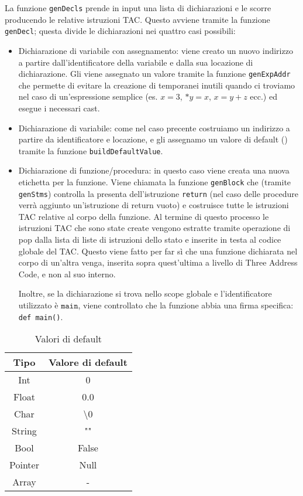 La funzione {\tt genDecls} prende in input una lista di dichiarazioni e le scorre producendo le relative istruzioni TAC. Questo avviene tramite la funzione {\tt genDecl}; questa divide le dichiarazioni nei quattro casi possibili:
\begin{itemize}
    \item Dichiarazione di variabile con assegnamento: viene creato un nuovo indirizzo a partire dall'identificatore della variabile e dalla sua locazione di dichiarazione. Gli viene assegnato un valore tramite la funzione {\tt genExpAddr} che permette di evitare la creazione di temporanei inutili quando ci troviamo nel caso di un'espressione semplice (es. $x = 3$, $*y= x$, $x = y + z$ ecc.) ed esegue i necessari cast.
    \item Dichiarazione di variabile: come nel caso precente costruiamo un indirizzo a partire da identificatore e locazione, e gli assegnamo un valore di default (\label{table:valori_default}) tramite la funzione {\tt buildDefaultValue}.
    \item Dichiarazione di funzione/procedura: in questo caso viene creata una nuova etichetta per la funzione. Viene chiamata la funzione {\tt genBlock} che (tramite {\tt genStms}) controlla la presenta dell'istruzione {\tt return} (nel caso delle procedure verrà aggiunto un'istruzione di return vuoto) e costruisce tutte le istruzioni TAC relative al corpo della funzione. Al termine di questo processo le istruzioni TAC che sono state create vengono estratte tramite operazione di pop dalla lista di liste di istruzioni dello stato e inserite in testa al codice globale del TAC. Questo viene fatto per far sì che una funzione dichiarata nel corpo di un'altra venga, inserita sopra quest'ultima a livello di Three Address Code, e non al suo interno. 
    
    Inoltre, se la dichiarazione si trova nello scope globale e l'identificatore utilizzato è $\texttt{main}$, viene controllato che la funzione abbia una firma specifica: {\tt def main()}.
\end{itemize}

\begin{table}
\centering
    \begin{tabular}{|c c|} 
        \hline
        Tipo & Valore di default \\ [0.5ex] 
        \hline\hline
        Int & 0 \\ 
        Float & 0.0  \\
        Char & \textbackslash0 \\
        String &  "" \\
        Bool & False \\ 
        Pointer & Null\\
        Array & - \\[1ex] 
        \hline
    \end{tabular}
    \caption{Valori di default}
    \label{table:valori_default}
\end{table}


